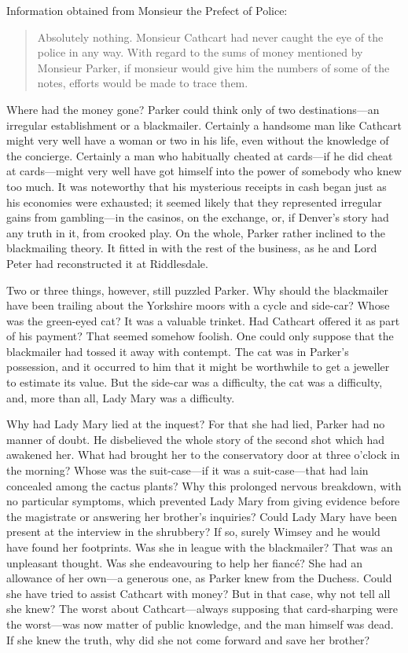 Information obtained from Monsieur the Prefect of Police:

\begin{quote}
Absolutely nothing. Monsieur Cathcart had never caught the eye of the police in any way. With regard to the sums of money mentioned by Monsieur Parker, if monsieur would give him the numbers of some of the notes, efforts would be made to trace them.
\end{quote}

Where had the money gone? Parker could think only of two destinations—an irregular establishment or a blackmailer. Certainly a handsome man like Cathcart might very well have a woman or two in his life, even without the knowledge of the concierge. Certainly a man who habitually cheated at cards—if he did cheat at cards—might very well have got himself into the power of somebody who knew too much.  It was noteworthy that his mysterious receipts in cash began just as his economies were exhausted; it seemed likely that they represented irregular gains from gambling—in the casinos, on the exchange, or, if Denver's story had any truth in it, from crooked play. On the whole, Parker rather inclined to the blackmailing theory. It fitted in with the rest of the business, as he and Lord Peter had reconstructed it at Riddlesdale.

Two or three things, however, still puzzled Parker. Why should the blackmailer have been trailing about the Yorkshire moors with a cycle and side-car? Whose was the green-eyed cat? It was a valuable trinket.  Had Cathcart offered it as part of his payment? That seemed somehow foolish. One could only suppose that the blackmailer had tossed it away with contempt. The cat was in Parker's possession, and it occurred to him that it might be worthwhile to get a jeweller to estimate its value.  But the side-car was a difficulty, the cat was a difficulty, and, more than all, Lady Mary was a difficulty.

Why had Lady Mary lied at the inquest? For that she had lied, Parker had no manner of doubt. He disbelieved the whole story of the second shot which had awakened her. What had brought her to the conservatory door at three o'clock in the morning? Whose was the suit-case—if it was a suit-case—that had lain concealed among the cactus plants? Why this prolonged nervous breakdown, with no particular symptoms, which prevented Lady Mary from giving evidence before the magistrate or answering her brother's inquiries? Could Lady Mary have been present at the interview in the shrubbery? If so, surely Wimsey and he would have found her footprints. Was she in league with the blackmailer? That was an unpleasant thought. Was she endeavouring to help her fiancé? She had an allowance of her own—a generous one, as Parker knew from the Duchess. Could she have tried to assist Cathcart with money? But in that case, why not tell all she knew? The worst about Cathcart—always supposing that card-sharping were the worst—was now matter of public knowledge, and the man himself was dead. If she knew the truth, why did she not come forward and save her brother?

